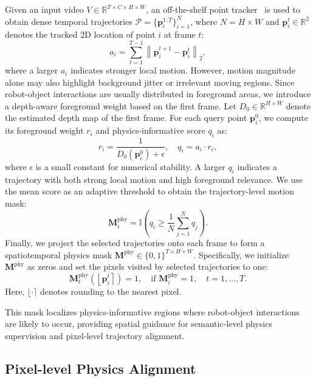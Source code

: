 Given an input video $V\in\mathbb{R}^{T\times C\times H\times W}$, an off-the-shelf point
tracker~\cite{karaev24cotracker3} is used to obtain dense temporal trajectories
$\mathcal{P}=\{\mathbf{p}_i^{1:T}\}_{i=1}^{N}$, where $N=H\times W$ and
$\mathbf{p}_i^t\in\mathbb{R}^2$ denotes the tracked 2D location of point $i$ at frame $t$:
\begin{equation}
a_i=\sum_{t=1}^{T-1}\left\|\mathbf{p}_i^{t+1}-\mathbf{p}_i^{t}\right\|_2 ,
\end{equation}
where a larger $a_i$ indicates stronger local motion. However, motion magnitude alone may also
highlight background jitter or irrelevant moving regions. Since robot-object interactions are usually
distributed in foreground areas, we introduce a depth-aware foreground weight based on the first
frame. Let $D_0\in\mathbb{R}^{H\times W}$ denote the estimated depth map of the first frame. For each
query point $\mathbf{p}_i^0$, we compute its foreground weight $r_i$ and physics-informative score $q_i$ as:
\begin{equation}
r_i=\frac{1}{D_0(\mathbf{p}_i^0)+\epsilon},
\quad
q_i=a_i\cdot r_i ,
\end{equation}
where $\epsilon$ is a small constant for numerical stability. A larger $q_i$ indicates a trajectory with
both strong local motion and high foreground relevance. We use the mean score as an adaptive threshold to obtain the trajectory-level motion mask:
\begin{equation}
\mathbf{M}^{\mathrm{phy}}_i=\mathbb{I}\left(q_i \geq \frac{1}{N}\sum_{j=1}^{N}q_j\right).
\end{equation}
Finally, we project the selected trajectories onto each frame to form a spatiotemporal physics mask
$\mathbf{M}^{\mathrm{phy}}\in\{0,1\}^{T\times H\times W}$. Specifically, we initialize $\mathbf{M}^{\mathrm{phy}}$ as zeros and set
the pixels visited by selected trajectories to one:
\begin{equation}
\mathbf{M}^{\mathrm{phy}}_t\left(\left\lfloor \mathbf{p}_i^t \right\rceil\right)=1,
\quad \text{if } \mathbf{M}^{\mathrm{phy}}_i=1,\quad t=1,\dots,T .
\end{equation}
Here, $\lfloor \cdot \rceil$ denotes rounding to the nearest pixel.

This mask localizes physics-informative regions where robot-object interactions are likely to occur,
providing spatial guidance for semantic-level physics supervision and pixel-level trajectory alignment.

\subsection{Pixel-level Physics Alignment}

